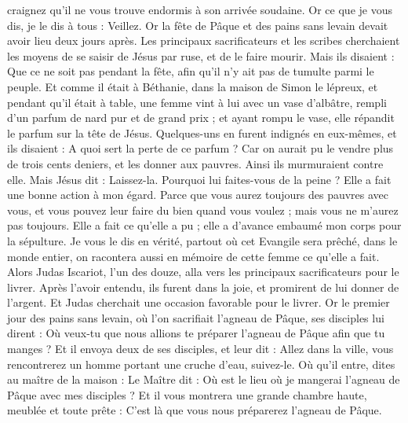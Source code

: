 \begin{multicols}{2}
craignez qu'il ne vous trouve endormis à son arrivée soudaine.
Or ce que je vous dis, je le dis à tous : Veillez.
\VerseOne{}Or la fête de Pâque et des pains sans levain devait avoir lieu deux jours après. Les principaux sacrificateurs et les scribes cherchaient les moyens de se saisir de Jésus par ruse, et de le faire mourir.
Mais ils disaient : Que ce ne soit pas pendant la fête, afin qu'il n'y ait pas de tumulte parmi le peuple.
Et comme il était à Béthanie, dans la maison de Simon le lépreux, et pendant qu'il était à table, une femme vint à lui avec un vase d'albâtre, rempli d'un parfum de nard pur et de grand prix ; et ayant rompu le vase, elle répandit le parfum sur la tête de Jésus.
Quelques-uns en furent indignés en eux-mêmes, et ils disaient : A quoi sert la perte de ce parfum ?
Car on aurait pu le vendre plus de trois cents deniers, et les donner aux pauvres. Ainsi ils murmuraient contre elle.
Mais Jésus dit : Laissez-la. Pourquoi lui faites-vous de la peine ? Elle a fait une bonne action à mon égard.
Parce que vous aurez toujours des pauvres avec vous, et vous pouvez leur faire du bien quand vous voulez ; mais vous ne m'aurez pas toujours.
Elle a fait ce qu'elle a pu ; elle a d'avance embaumé mon corps pour la sépulture.
Je vous le dis en vérité, partout où cet Evangile sera prêché, dans le monde entier, on racontera aussi en mémoire de cette femme ce qu'elle a fait.
Alors Judas Iscariot, l'un des douze, alla vers les principaux sacrificateurs pour le livrer.
Après l'avoir entendu, ils furent dans la joie, et promirent de lui donner de l'argent. Et Judas cherchait une occasion favorable pour le livrer.
Or le premier jour des pains sans levain, où l'on sacrifiait l'agneau de Pâque, ses disciples lui dirent : Où veux-tu que nous allions te préparer l'agneau de Pâque afin que tu manges ?
Et il envoya deux de ses disciples, et leur dit : Allez dans la ville, vous rencontrerez un homme portant une cruche d'eau, suivez-le.
Où qu'il entre, dites au maître de la maison : Le Maître dit : Où est le lieu où je mangerai l'agneau de Pâque avec mes disciples ?
Et il vous montrera une grande chambre haute, meublée et toute prête : C'est là que vous nous préparerez l'agneau de Pâque.

\end{multicols}
